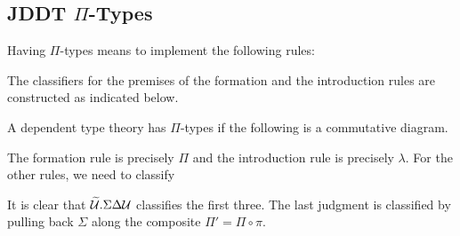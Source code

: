 \documentclass{amsart}
\begin{document}
\subsection{JDDT $\Pi$-Types}
\label{sec:jddt-pi-types}

Having $\Pi$-types means to implement the following rules:

The classifiers for the premises of the formation and the introduction rules are constructed as indicated below.


A dependent type theory has $\Pi$-types if the following is a commutative diagram.


The formation rule is precisely $\Pi$ and the introduction rule is precisely $\lambda$.
For the other rules, we need to classify
It is clear that $\widetilde{\mathcal{U}}.\Sigma\Delta\mathcal{U}$ classifies the first three.
The last judgment is classified by pulling back $\Sigma$ along the composite $\Pi' = \Pi \circ \pi$.





\end{document}
